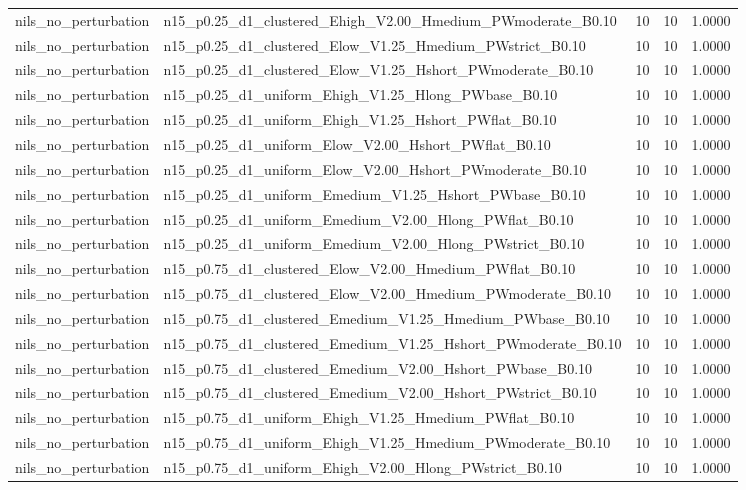 \begin{tabular}{llrrr}
nils_no_perturbation & n15_p0.25_d1_clustered_Ehigh_V2.00_Hmedium_PWmoderate_B0.10 & 10 & 10 & 1.0000 \\
nils_no_perturbation & n15_p0.25_d1_clustered_Elow_V1.25_Hmedium_PWstrict_B0.10 & 10 & 10 & 1.0000 \\
nils_no_perturbation & n15_p0.25_d1_clustered_Elow_V1.25_Hshort_PWmoderate_B0.10 & 10 & 10 & 1.0000 \\
nils_no_perturbation & n15_p0.25_d1_uniform_Ehigh_V1.25_Hlong_PWbase_B0.10 & 10 & 10 & 1.0000 \\
nils_no_perturbation & n15_p0.25_d1_uniform_Ehigh_V1.25_Hshort_PWflat_B0.10 & 10 & 10 & 1.0000 \\
nils_no_perturbation & n15_p0.25_d1_uniform_Elow_V2.00_Hshort_PWflat_B0.10 & 10 & 10 & 1.0000 \\
nils_no_perturbation & n15_p0.25_d1_uniform_Elow_V2.00_Hshort_PWmoderate_B0.10 & 10 & 10 & 1.0000 \\
nils_no_perturbation & n15_p0.25_d1_uniform_Emedium_V1.25_Hshort_PWbase_B0.10 & 10 & 10 & 1.0000 \\
nils_no_perturbation & n15_p0.25_d1_uniform_Emedium_V2.00_Hlong_PWflat_B0.10 & 10 & 10 & 1.0000 \\
nils_no_perturbation & n15_p0.25_d1_uniform_Emedium_V2.00_Hlong_PWstrict_B0.10 & 10 & 10 & 1.0000 \\
nils_no_perturbation & n15_p0.75_d1_clustered_Elow_V2.00_Hmedium_PWflat_B0.10 & 10 & 10 & 1.0000 \\
nils_no_perturbation & n15_p0.75_d1_clustered_Elow_V2.00_Hmedium_PWmoderate_B0.10 & 10 & 10 & 1.0000 \\
nils_no_perturbation & n15_p0.75_d1_clustered_Emedium_V1.25_Hmedium_PWbase_B0.10 & 10 & 10 & 1.0000 \\
nils_no_perturbation & n15_p0.75_d1_clustered_Emedium_V1.25_Hshort_PWmoderate_B0.10 & 10 & 10 & 1.0000 \\
nils_no_perturbation & n15_p0.75_d1_clustered_Emedium_V2.00_Hshort_PWbase_B0.10 & 10 & 10 & 1.0000 \\
nils_no_perturbation & n15_p0.75_d1_clustered_Emedium_V2.00_Hshort_PWstrict_B0.10 & 10 & 10 & 1.0000 \\
nils_no_perturbation & n15_p0.75_d1_uniform_Ehigh_V1.25_Hmedium_PWflat_B0.10 & 10 & 10 & 1.0000 \\
nils_no_perturbation & n15_p0.75_d1_uniform_Ehigh_V1.25_Hmedium_PWmoderate_B0.10 & 10 & 10 & 1.0000 \\
nils_no_perturbation & n15_p0.75_d1_uniform_Ehigh_V2.00_Hlong_PWstrict_B0.10 & 10 & 10 & 1.0000 \\

\end{tabular}
